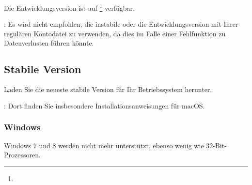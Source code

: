 \noindent
Die Entwicklungsversion ist auf \footnote{\urlGitHubGrisbi} verfügbar.

\noindent
\Attention{}: Es wird nicht empfohlen, die instabile oder die Entwicklungsversion mit Ihrer regulären Kontodatei zu verwenden, da dies im Falle einer Fehlfunktion zu Datenverlusten führen könnte.

\subsection{Stabile Version\label{start-install-stable}}

Laden Sie die neueste stabile Version für Ihr Betriebssystem herunter.

\noindent
\Note{}: Dort finden Sie insbesondere Installationsanweisungen für macOS.

\subsubsection{Windows\label{start-install-stable-windows}}

Windows 7 und 8 werden nicht mehr unterstützt, ebenso wenig wie 32-Bit-Prozessoren.

